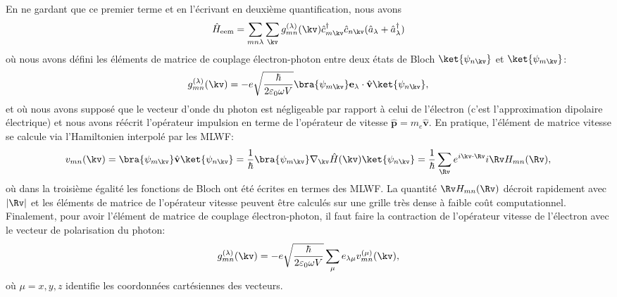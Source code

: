 En ne gardant que ce premier terme et en l'écrivant en deuxième quantification, nous avons
\begin{equation}
    \hat{H}_\text{eem}=\sum_{mn\lambda}\sum_\kv g_{mn}^{(\lambda)}(\kv)\hat{c}^\dag_{m\kv}\hat{c}_{n\kv}(\hat{a}_\lambda+\hat{a}^\dag_\lambda)
\end{equation}
où nous avons défini les éléments de matrice de couplage électron-photon entre deux états de Bloch $\ket{\psi_{n\kv}}$ et $\ket{\psi_{m\kv}}$: 
\begin{equation}
    g^{(\lambda)}_{mn}(\kv) = -e\sqrt{\frac{\hbar}{2\varepsilon_0 \omega V}}\bra{\psi_{m\kv}}\mathbf{e}_\lambda\cdot\hat{\mathbf{v}}\ket{\psi_{n\kv}},
\end{equation}
et où nous avons supposé que le vecteur d'onde du photon est négligeable par rapport à celui de l'électron (c'est l'approximation dipolaire électrique) et nous avons réécrit l'opérateur impulsion en terme de l'opérateur de vitesse $\hat{\mathbf{p}}=m_e\hat{\mathbf{v}}$. En pratique, l'élément de matrice vitesse se calcule via l'Hamiltonien interpolé par les MLWF:
\begin{equation}
    v_{mn}(\kv)=\bra{\psi_{m\kv}}\hat{\mathbf{v}}\ket{\psi_{n\kv}}=\frac{1}{\hbar}\bra{\psi_{m\kv}}\nabla_\kv \hat{H}(\kv)\ket{\psi_{n\kv}} = \frac{1}{\hbar}\sum_{\Rv}e^{i\kv\cdot\Rv}i\Rv H_{mn}(\Rv),
\end{equation}
où dans la troisième égalité les fonctions de Bloch ont été écrites en termes des MLWF. La quantité $\Rv H_{mn}(\Rv)$ décroit rapidement avec $|\Rv|$ et les éléments de matrice de l'opérateur vitesse peuvent être calculés sur une grille très dense à faible coût computationnel. Finalement, pour avoir l'élément de matrice de couplage électron-photon, il faut faire la contraction de l'opérateur vitesse de l'électron avec le vecteur de polarisation du photon:
\begin{equation}
    g^{(\lambda)}_{mn}(\kv) = -e\sqrt{\frac{\hbar}{2\varepsilon_0\omega V}}\sum_\mu e_{\lambda\mu}v_{mn}^{(\mu)}(\kv),
\end{equation}
où $\mu=x,y,z$ identifie les coordonnées cartésiennes des vecteurs.

